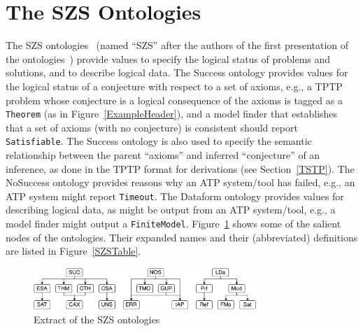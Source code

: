 \documentclass{easychair}
\begin{document}
\section{The SZS Ontologies}
\label{SZS}

The SZS ontologies~\cite{Sut08-KEAPPA} (named ``SZS'' after the authors of the first presentation 
of the ontologies~\cite{SZS03}) provide values to specify the logical status of problems and
solutions, and to describe logical data.
The Success ontology provides values for the logical status of a conjecture with respect to a 
set of axioms, e.g., a TPTP problem whose conjecture is a logical consequence of the axioms 
is tagged as a {\tt Theorem} (as in Figure~\ref{ExampleHeader}), and a model finder that 
establishes that a set of axioms (with no conjecture) is consistent should report 
{\tt Satisfiable}.
The Success ontology is also used to specify the semantic relationship between the parent 
``axioms'' and inferred ``conjecture'' of an inference, as done in the TPTP format for 
derivations (see Section~\ref{TSTP}).
The NoSuccess ontology provides reasons why an ATP system/tool has failed, e.g., an ATP system 
might report {\tt Timeout}.
The Dataform ontology provides values for describing logical data, as might be output 
from an ATP system/tool, e.g., a model finder might output a {\tt FiniteModel}.
Figure~\ref{SZSExtract} shows some of the salient nodes of the ontologies.
Their expanded names and their (abbreviated) definitions are listed in Figure~\ref{SZSTable}.

\begin{figure}[htb]
\centering
\includegraphics[width=0.75\textwidth]{SZSExtract.pdf}
\caption{Extract of the SZS ontologies}
\label{SZSExtract}
\end{figure} 
\end{document}

